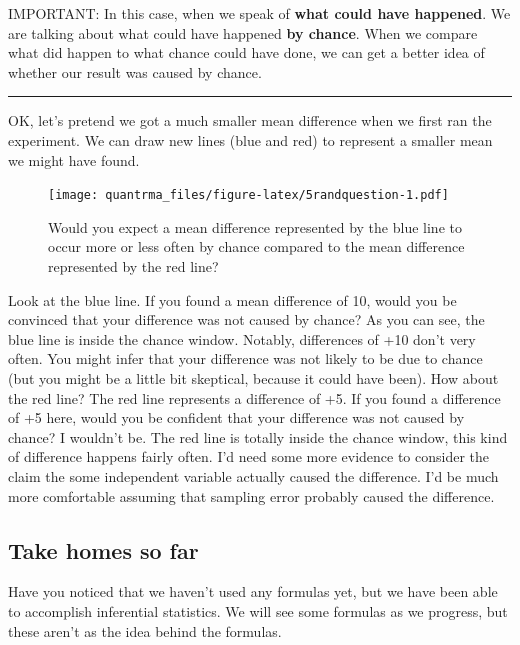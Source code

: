 \documentclass[
]{book}
\begin{document}
IMPORTANT: In this case, when we speak of \textbf{what could have happened}. We are talking about what could have happened \textbf{by chance}. When we compare what did happen to what chance could have done, we can get a better idea of whether our result was caused by chance.

\begin{center}\rule{0.5\linewidth}{0.5pt}\end{center}

OK, let's pretend we got a much smaller mean difference when we first ran the experiment. We can draw new lines (blue and red) to represent a smaller mean we might have found.

\begin{figure}
\centering
\texttt{[image: quantrma\_files/figure-latex/5randquestion-1.pdf]}
\caption{\label{fig:5randquestion}Would you expect a mean difference represented by the blue line to occur more or less often by chance compared to the mean difference represented by the red line?}
\end{figure}

Look at the blue line. If you found a mean difference of 10, would you be convinced that your difference was not caused by chance? As you can see, the blue line is inside the chance window. Notably, differences of +10 don't very often. You might infer that your difference was not likely to be due to chance (but you might be a little bit skeptical, because it could have been). How about the red line? The red line represents a difference of +5. If you found a difference of +5 here, would you be confident that your difference was not caused by chance? I wouldn't be. The red line is totally inside the chance window, this kind of difference happens fairly often. I'd need some more evidence to consider the claim the some independent variable actually caused the difference. I'd be much more comfortable assuming that sampling error probably caused the difference.

\hypertarget{take-homes-so-far}{%
\subsection{Take homes so far}\label{take-homes-so-far}}

Have you noticed that we haven't used any formulas yet, but we have been able to accomplish inferential statistics. We will see some formulas as we progress, but these aren't as the idea behind the formulas.
\end{document}
